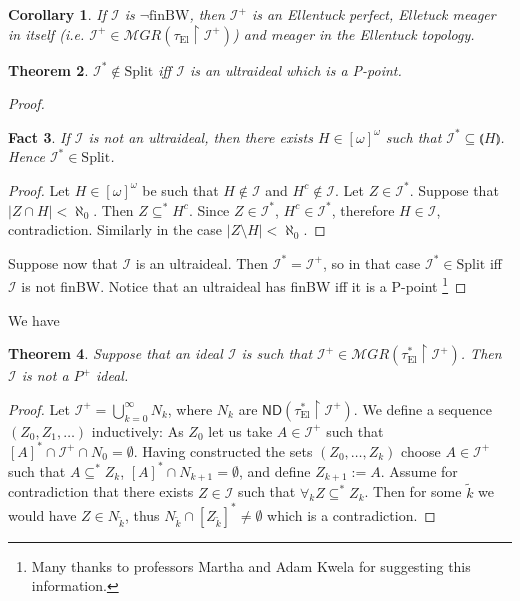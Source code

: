 \documentclass[12pt]{amsart}
\theoremstyle{plain}
\newtheorem{theorem}{Theorem}[section]
\newtheorem{corollary}[theorem]{Corollary}
\newtheorem{fact}[theorem]{Fact}
\theoremstyle{definition}
\theoremstyle{remark}
\newcommand{\infsub}{[\omega]^{\omega}}
\newcommand{\meager}{{\mathcal MGR}}
\newcommand{\ND}{\mathsf{ND}}
\newcommand{\calI}{\mathcal{I}}
\newcommand{\EllentuckTopology}{\tau_\mathrm{El}}
\newcommand{\EllentuckTopologyStar}{\EllentuckTopology^*}
\newcommand{\Split}{\mathrm{Split}}
\newcommand{\lNawiasik}{\lParen}
\newcommand{\rNawiasik}{\rParen}
\newcommand{\notfinBW}{\neg \mathrm{finBW}}
\begin{document}
\begin{corollary}
  If $\calI$ is $\notfinBW$, then
  $\calI^+$ is an Ellentuck perfect, Elletuck meager in itself
(i.e. $\calI^+ \in \meager(\EllentuckTopology \restriction \calI^+)$)
and meager in the Ellentuck topology. 
\end{corollary}

\begin{theorem}
  $\calI^* \not\in \Split$ iff $\calI$ is an ultraideal
which is a P-point.
\end{theorem}
\begin{proof}

  \begin{fact}
    If $\calI$ is not an ultraideal, then
    there exists $H \in \infsub$ such that
    $\calI^* \subseteq \lNawiasik H \rNawiasik$.
    Hence $\calI^* \in \Split$.
  \end{fact}
  \begin{proof}
    Let $H\in\infsub$ be such that $H\not\in\calI$
    and $H^c \not\in\calI$. Let $Z \in \calI^*$.
    Suppose that $|Z \cap H| < \aleph_0$.
    Then $Z\subseteq^* H^c$. Since $Z\in\calI^*$,
    $H^c\in\calI^*$, therefore $H\in\calI$, contradiction.
    Similarly in the case $|Z\setminus H| < \aleph_0$.
  \end{proof}

  Suppose now that $\calI$ is an ultraideal.
Then $\calI^* = \calI^+$, so in that
case $\calI^* \in \Split$ iff
$\calI$ is not finBW.
Notice that an ultraideal has finBW iff
it is a P-point \footnote{
Many thanks to professors Martha and Adam Kwela for suggesting this information.
} 
\end{proof}

We have
\begin{theorem}
  Suppose that an ideal $\calI$
is such that $\calI^+ \in \meager(\EllentuckTopologyStar \restriction \calI^+)$.
Then $\calI$ is not a $P^+$ ideal.
\end{theorem}

\begin{proof}
  Let $\calI^+ = \bigcup_{k=0}^\infty N_k$,
where $N_k$ are $\ND(\EllentuckTopologyStar \restriction \calI^+)$.
We define a sequence $(Z_0, Z_1, \ldots)$ inductively:
As $Z_0$ let us take $A \in \calI^+$ such that
$[A]^* \cap \calI^+ \cap N_0 = \emptyset$.
Having constructed the sets $(Z_0, \ldots, Z_k)$
choose $A \in \calI^+$ such that
$A \subseteq^* Z_k$,
$[A]^* \cap N_{k+1} = \emptyset$,
and define $Z_{k+1} := A$.
Assume for contradiction that there exists
$Z \in \calI$ such that
$\forall_k Z \subseteq^* Z_k$.
Then for some $\tilde{k}$ we would have
$Z \in N_{\tilde{k}}$, thus
$ N_{\tilde{k}} \cap [Z_{\tilde{k}}]^* \not= \emptyset$
which is a contradiction.
\end{proof}
\end{document}

